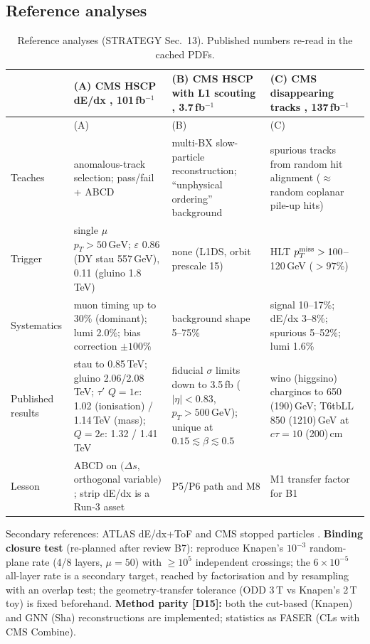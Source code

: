\documentclass[11pt,a4paper]{article}
\newcommand{\GeV}{\,\mathrm{GeV}}
\begin{document}
\subsection{Reference analyses}
{\small
\begin{longtable}{@{}L{2.34cm}L{4.59cm}L{4.49cm}L{4.69cm}@{}}
\caption{Reference analyses (STRATEGY Sec.~13). Published numbers re-read in the cached PDFs.}\label{tab:ref}\\
\toprule & (A) CMS HSCP dE/dx \cite{HSCP}, 101\,fb$^{-1}$ & (B) CMS HSCP with L1 scouting \cite{L1DS}, 3.7\,fb$^{-1}$ & (C) CMS disappearing tracks \cite{DT}, 137\,fb$^{-1}$\\\midrule\endfirsthead
\toprule & (A) & (B) & (C)\\\midrule\endhead
\bottomrule\endfoot
Teaches & anomalous-track selection; pass/fail + ABCD & multi-BX slow-particle reconstruction; ``unphysical ordering'' background & spurious tracks from random hit alignment ($\approx$ random coplanar pile-up hits)\\
Trigger & single $\mu$ $p_T>50\GeV$; $\varepsilon$ 0.86 (DY stau 557\,GeV), 0.11 (gluino 1.8\,TeV) & none (L1DS, orbit prescale 15) & HLT $p_T^{\rm miss}>100$--120\,GeV ($>97\%$)\\
Systematics & muon timing up to 30\% (dominant); lumi 2.0\%; bias correction $\pm100\%$ & background shape 5--75\% & signal 10--17\%; dE/dx 3--8\%; spurious 5--52\%; lumi 1.6\%\\
Published results & stau to 0.85\,TeV; gluino 2.06/2.08\,TeV; $\tau'$ $Q=1e$: 1.02 (ionisation) / 1.14\,TeV (mass); $Q=2e$: 1.32 / 1.41\,TeV & fiducial $\sigma$ limits down to 3.5\,fb ($|\eta|<0.83$, $p_T>500\GeV$); unique at $0.15\lesssim\beta\lesssim0.5$ & wino (higgsino) charginos to 650 (190)\,GeV; T6tbLL 850 (1210)\,GeV at $c\tau=10$ (200)\,cm\\
Lesson & ABCD on $(\Delta s$, orthogonal variable$)$; strip dE/dx is a Run-3 asset & P5/P6 path and M8 & M1 transfer factor for B1\\
\end{longtable}
}
Secondary references: ATLAS dE/dx+ToF \cite{ATLASHSCP} and CMS stopped particles \cite{stopped}. \textbf{Binding closure test} (re-planned after review B7): reproduce Knapen's $10^{-3}$ random-plane rate (4/8 layers, $\mu=50$) with $\geq10^5$ independent crossings; the $6\times10^{-5}$ all-layer rate is a secondary target, reached by factorisation and by resampling with an overlap test; the geometry-transfer tolerance (ODD 3\,T vs Knapen's 2\,T toy) is fixed beforehand. \textbf{Method parity [D15]:} both the cut-based (Knapen) and GNN (Sha) reconstructions are implemented; statistics as FASER (CLs with CMS Combine).
\end{document}
